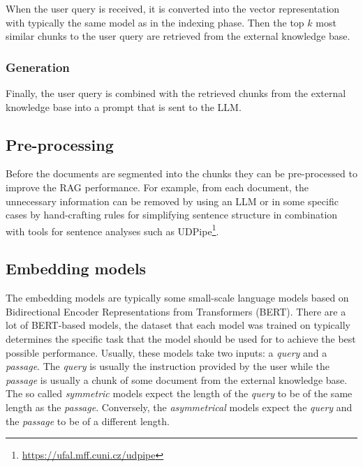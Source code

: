 When the user query is received, it is converted into the vector representation with typically the same model as in the indexing phase. Then the top $k$ most similar chunks to the user query are retrieved from the external knowledge base.


\subsubsection{Generation}

Finally, the user query is combined with the retrieved chunks from the external knowledge base into a prompt that is sent to the LLM.


\subsection{Pre-processing}

Before the documents are segmented into the chunks they can be pre-processed to improve the RAG performance. For example, from each document, the unnecessary information can be removed by using an LLM or in some specific cases by hand-crafting rules for simplifying sentence structure in combination with tools for sentence analyses such as UDPipe\footnote{\url{https://ufal.mff.cuni.cz/udpipe}}.


\subsection{Embedding models}

The embedding models are typically some small-scale language models based on Bidirectional Encoder Representations from Transformers (BERT). There are a lot of BERT-based models, the dataset that each model was trained on typically determines the specific task that the model should be used for to achieve the best possible performance. Usually, these models take two inputs: a \textit{query} and a \textit{passage}. The \textit{query} is usually the instruction provided by the user while the \textit{passage} is usually a chunk of some document from the external knowledge base. The so called \textit{symmetric} models expect the length of the \textit{query} to be of the same length as the \textit{passage}. Conversely, the \textit{asymmetrical} models expect the \textit{query} and the \textit{passage} to be of a different length.